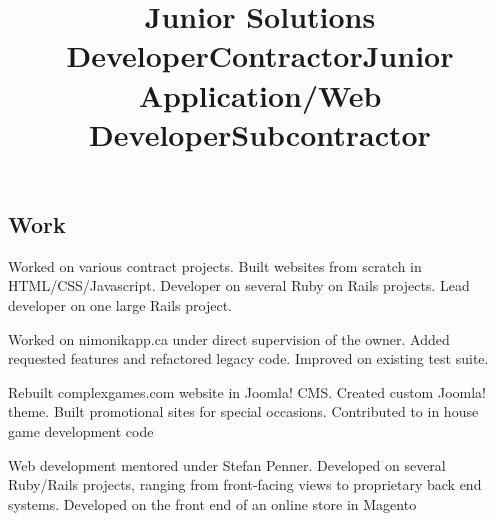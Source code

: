 \documentclass[margin,line,letterpaper]{resume}
\begin{document}
\begin{resume}
  \section{\mysidestyle Work}

  \title{\bf Junior Solutions Developer}
  \location{}
  \begin{position}
    Worked on various contract projects. Built websites from scratch
    in HTML/CSS/Javascript. Developer on several Ruby on Rails
    projects. Lead developer on one large Rails project.
  \end{position}

  \title{\bf Contractor}
  \location{ }
  \begin{position}
    Worked on nimonikapp.ca under direct supervision of the owner. 
    Added requested features and refactored legacy code. Improved
    on existing test suite. 
  \end{position}

  \title{\bf Junior Application/Web Developer}
  \location{ }
  \begin{position}
    Rebuilt complexgames.com website in Joomla! CMS. Created custom Joomla! theme. Built promotional sites for special occasions. Contributed to in house game development code
  \end{position}

  \title{\bf Subcontractor}
  \location{ }
  \begin{position}
    Web development mentored under Stefan Penner. Developed on several Ruby/Rails projects, ranging from front-facing views to proprietary back end systems. Developed on the front end of an online store in Magento
  \end{position}
\end{resume}
\end{document}

